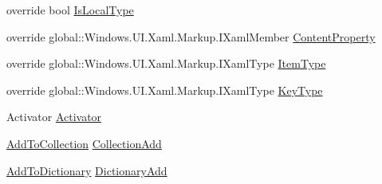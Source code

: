 \begin{DoxyCompactItemize}
override bool \hyperlink{class_eli_log_in_app_1_1_eli_log_in_app___xaml_type_info_1_1_xaml_user_type_a03b1250ebe6b9b4b5c826fe744132b4f}{Is\+Local\+Type}
\item 
override global\+::\+Windows.\+U\+I.\+Xaml.\+Markup.\+I\+Xaml\+Member \hyperlink{class_eli_log_in_app_1_1_eli_log_in_app___xaml_type_info_1_1_xaml_user_type_a7a52133d8342825f6d011c6c0c22216d}{Content\+Property}
\item 
override global\+::\+Windows.\+U\+I.\+Xaml.\+Markup.\+I\+Xaml\+Type \hyperlink{class_eli_log_in_app_1_1_eli_log_in_app___xaml_type_info_1_1_xaml_user_type_a5230fee2bc9c1d698cd76dd43f7eb208}{Item\+Type}
\item 
override global\+::\+Windows.\+U\+I.\+Xaml.\+Markup.\+I\+Xaml\+Type \hyperlink{class_eli_log_in_app_1_1_eli_log_in_app___xaml_type_info_1_1_xaml_user_type_ada82e77137df2616a54c13785d728c7e}{Key\+Type}
\item 
Activator \hyperlink{class_eli_log_in_app_1_1_eli_log_in_app___xaml_type_info_1_1_xaml_user_type_aa51a1b29493d4e80d7b7f0bdf2c63c73}{Activator}
\item 
\hyperlink{namespace_eli_log_in_app_1_1_eli_log_in_app___xaml_type_info_ae065c6471eb08de467f9dcf77418eceb}{Add\+To\+Collection} \hyperlink{class_eli_log_in_app_1_1_eli_log_in_app___xaml_type_info_1_1_xaml_user_type_a0a7c7544e0117e0f44121d69df3d8e1d}{Collection\+Add}
\item 
\hyperlink{namespace_eli_log_in_app_1_1_eli_log_in_app___xaml_type_info_a2190230291cdc4abb09b6c76730fd8b2}{Add\+To\+Dictionary} \hyperlink{class_eli_log_in_app_1_1_eli_log_in_app___xaml_type_info_1_1_xaml_user_type_a0f200c1b4ed794737f0d03f88a26d680}{Dictionary\+Add}
\end{DoxyCompactItemize}
